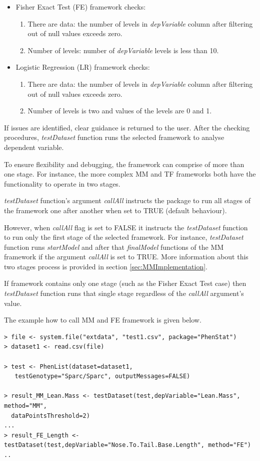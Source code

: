 \documentclass[12pt,a4paper]{article}
\begin{document}
\begin{itemize}
\begin{enumerate}
\end{enumerate}
\item Fisher Exact Test (FE) framework checks: 
\begin{enumerate}
\item There are data: the number of levels in \textit{depVariable} column after filtering out of null values exceeds zero.
\item Number of levels: number of \textit{depVariable} levels is less than 10.
\end{enumerate}
\item Logistic Regression (LR) framework checks: 
\begin{enumerate}
\item There are data: the number of levels in \textit{depVariable} column after filtering out of null values exceeds zero.
\item Number of levels is two and values of the levels are 0 and 1.
\end{enumerate}
\end{itemize}

If issues are identified, clear guidance is returned to the user. 
After the checking procedures, \textit{testDataset} function runs the selected framework to analyse dependent variable. 

To ensure flexibility and debugging, the framework can comprise of more than one stage. For instance, the more complex MM and TF frameworks both have the functionality to operate in two stages.

\textit{testDataset} function's argument \textit{callAll} instructs the package to run all stages of the framework one after another when set to TRUE (default behaviour). 

However, when \textit{callAll} flag is set to FALSE it instructs the \textit{testDataset} function to run only the first stage of the selected framework.
For instance, \textit{testDataset} function runs \textit{startModel} and after that \textit{finalModel} functions of the MM framework if the argument \textit{callAll} is set to TRUE.  More information about this two stages process is provided in section \ref{sec:MMImplementation}.

If framework contains only one stage (such as the Fisher Exact Test case) then \textit{testDataset} function runs that single stage regardless of the \textit{callAll} argument's value. 

The example how to call MM and FE framework is given below.


\begingroup
    \fontsize{8pt}{12pt}\selectfont
\begin{verbatim}
> file <- system.file("extdata", "test1.csv", package="PhenStat") 
> dataset1 <- read.csv(file)

> test <- PhenList(dataset=dataset1,
   testGenotype="Sparc/Sparc", outputMessages=FALSE)

> result_MM_Lean.Mass <- testDataset(test,depVariable="Lean.Mass", method="MM",
  dataPointsThreshold=2)
...
> result_FE_Length <- testDataset(test,depVariable="Nose.To.Tail.Base.Length", method="FE")
..
\end{verbatim}
\endgroup
\end{document}
